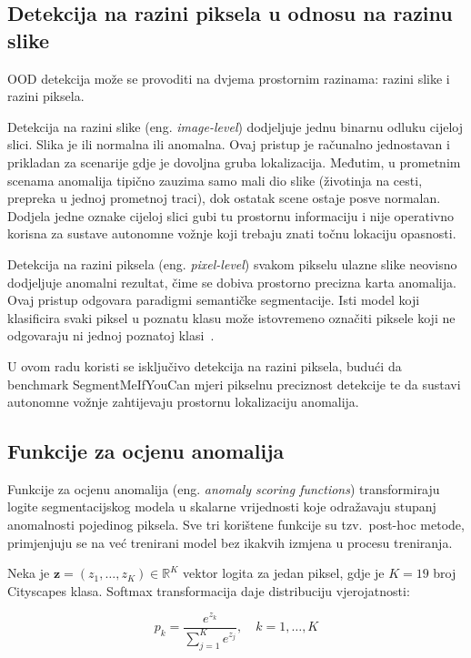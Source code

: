 \documentclass[diplomskirad]{fer}
\begin{document}
\subsection{Detekcija na razini piksela u odnosu na razinu slike}

OOD detekcija može se provoditi na dvjema prostornim razinama: razini slike i razini piksela.

Detekcija na razini slike (eng. \textit{image-level}) dodjeljuje jednu binarnu odluku cijeloj slici. Slika je ili normalna ili anomalna. Ovaj pristup je računalno jednostavan i prikladan za scenarije gdje je dovoljna gruba lokalizacija. Međutim, u prometnim scenama anomalija tipično zauzima samo mali dio slike (životinja na cesti, prepreka u jednoj prometnoj traci), dok ostatak scene ostaje posve normalan. Dodjela jedne oznake cijeloj slici gubi tu prostornu informaciju i nije operativno korisna za sustave autonomne vožnje koji trebaju znati točnu lokaciju opasnosti.

Detekcija na razini piksela (eng. \textit{pixel-level}) svakom pikselu ulazne slike neovisno dodjeljuje anomalni rezultat, čime se dobiva prostorno precizna karta anomalija. Ovaj pristup odgovara paradigmi semantičke segmentacije. Isti model koji klasificira svaki piksel u poznatu klasu može istovremeno označiti piksele koji ne odgovaraju ni jednoj poznatoj klasi~\cite{chan2021segmentmeifyoucanbenchmarkanomalysegmentation}.

U ovom radu koristi se isključivo detekcija na razini piksela, budući da benchmark SegmentMeIfYouCan mjeri pikselnu preciznost detekcije te da sustavi autonomne vožnje zahtijevaju prostornu lokalizaciju anomalija.

\subsection{Funkcije za ocjenu anomalija}

Funkcije za ocjenu anomalija (eng. \textit{anomaly scoring functions}) transformiraju logite segmentacijskog modela u skalarne vrijednosti koje odražavaju stupanj anomalnosti pojedinog piksela. Sve tri korištene funkcije su tzv.\ post-hoc metode, primjenjuju se na već trenirani model bez ikakvih izmjena u procesu treniranja.

Neka je $\mathbf{z} = (z_1, \ldots, z_K) \in \mathbb{R}^K$ vektor logita za jedan piksel, gdje je $K = 19$ broj Cityscapes klasa. Softmax transformacija daje distribuciju vjerojatnosti:

\begin{equation}
	p_k = \frac{e^{z_k}}{\sum_{j=1}^{K} e^{z_j}}, \quad k = 1, \ldots, K
\end{equation}
\end{document}
